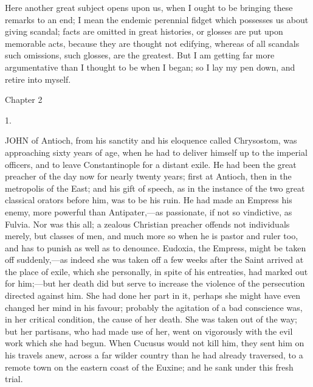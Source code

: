 Here another great subject opens upon us, when I ought to be bringing
these remarks to an end; I mean the endemic perennial fidget which
possesses us about giving scandal; facts are omitted in great
histories, or glosses are put upon memorable acts, because they are
thought not edifying, whereas of all scandals such omissions, such
glosses, are the greatest. But I am getting far more argumentative
than I thought to be when I began; so I lay my pen down, and retire
into myself.

Chapter 2


1.

JOHN of Antioch, from his sanctity and
his eloquence called Chrysostom, was approaching sixty years of age,
when he had to deliver himself up to the imperial officers, and to
leave Constantinople for a distant exile. He had been the great
preacher of the day now for nearly twenty years; first at Antioch,
then in the metropolis of the East; and his gift of speech, as in the
instance of the two great classical orators before him, was to be his
ruin. He had made an Empress his enemy, more powerful than Antipater,—as
passionate, if not so vindictive, as Fulvia. Nor was this all; a
zealous Christian preacher offends not individuals merely, but classes
of men, and much more so when he is pastor and ruler too, and has to
punish as well as to denounce. Eudoxia, the Empress, might be taken
off suddenly,—as indeed she was taken off a few weeks after the
Saint arrived at the place of exile, which she personally, in spite of
his entreaties, had marked out for him;—but her death did but serve
to increase the violence of the persecution directed against him. She
had done her part in it, perhaps she might have even changed her mind
in his favour; probably the agitation of a bad conscience was, in her
critical condition, the cause of her death. She was taken out of the
way; but her partisans, who had made use of her, went on
vigorously with the evil work which she had begun. When Cucusus would
not kill him, they sent him on his travels anew, across a far wilder
country than he had already traversed, to a remote town on the eastern
coast of the Euxine; and he sank under this fresh trial.

